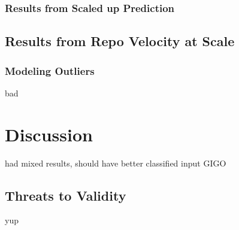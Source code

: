 \documentclass{article}
\begin{document}
\subsubsection{Results from Scaled up Prediction}

\subsection{Results from Repo Velocity at Scale}


\subsubsection{Modeling Outliers}

bad 

\section{Discussion}

had mixed results, should have better classified input GIGO

\subsection{Threats to Validity}

 yup



\end{document}
